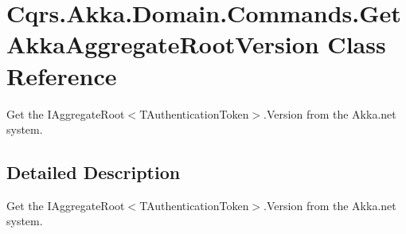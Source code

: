 \hypertarget{classCqrs_1_1Akka_1_1Domain_1_1Commands_1_1GetAkkaAggregateRootVersion}{}\section{Cqrs.\+Akka.\+Domain.\+Commands.\+Get\+Akka\+Aggregate\+Root\+Version Class Reference}
\label{classCqrs_1_1Akka_1_1Domain_1_1Commands_1_1GetAkkaAggregateRootVersion}


Get the I\+Aggregate\+Root$<$\+T\+Authentication\+Token$>$.\+Version from the Akka.\+net system.  




\subsection{Detailed Description}
Get the I\+Aggregate\+Root$<$\+T\+Authentication\+Token$>$.\+Version from the Akka.\+net system. 

